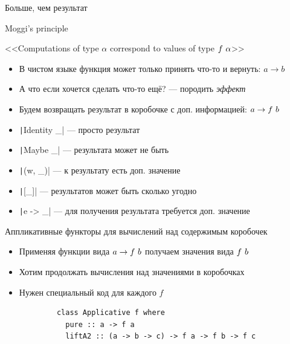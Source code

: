    
    \begin{frame}[fragile]{Больше, чем результат}
        \begin{block}{Moggi's principle}
            \begin{center}
                <<Computations of type $\alpha$ correspond to values of type $f~\alpha$>>
            \end{center}
        \end{block}
        \begin{itemize}
            \item В чистом языке функция может только принять что-то и вернуть: $a\to b$
            \item А что если хочется сделать что-то ещё? --- породить \emph{эффект}
            \item Будем возвращать результат в коробочке с доп. информацией: $a\to f~ b$
            \item[\eg] \texttt|Identity _| --- просто результат
            \item[\eg] \texttt|Maybe _| --- результата может не быть
            \item[\eg] \texttt|(w, _)| --- к результату есть доп. значение
            \item[\eg] \texttt|[_]| --- результатов может быть сколько угодно
            \item[\eg] \texttt|e -> _| --- для получения результата требуется доп. значение
        \end{itemize}
    \end{frame}

    \begin{frame}[fragile]{Аппликативные функторы для вычислений над содержимым коробочек}
        \begin{itemize}
            \item Применяя функции вида $a \to f ~ b$ получаем значения вида $f ~ b$
            \item Хотим продолжать вычисления над значениями в коробочках
            \item Нужен специальный код для каждого $f$
        \end{itemize}
        \pause
        \vspace{0.5em}
        \begin{verbatim}
            class Applicative f where
              pure :: a -> f a
              liftA2 :: (a -> b -> c) -> f a -> f b -> f c
        \end{verbatim}
    \end{frame}
    
